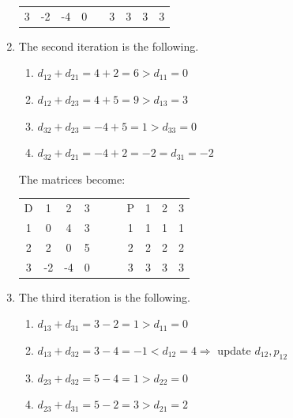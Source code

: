 \documentclass[12pt, a4paper]{report}
\begin{document}
\begin{enumerate}
\begin{table}[H]
\begin{tabular}{c|ccccc|ccc}
                    3 & -2       & -4       & 0          &                & 3 & 3 & 3 & 3  \\ 
                    \end{tabular}
                \end{table}
            \item The second iteration is the following. 
                \begin{enumerate}
                    \item $d_{12} + d_{21} = 4 + 2 = 6 > d_{11} = 0$
                    \item $d_{12} + d_{23} = 4 + 5 = 9 > d_{13} = 3$
                    \item $d_{32} + d_{23} = -4 + 5 = 1 > d_{33} = 0$
                    \item $d_{32} + d_{21} = -4 + 2 = -2 = d_{31} = -2$
                \end{enumerate}
                The matrices become: 
                \begin{table}[H]
                    \centering
                    \begin{tabular}{c|ccccc|ccc}
                    D & 1        & 2        & 3          & $\:\:\:\:\:\:$ & P & 1 & 2 & 3  \\ \cline{1-4} \cline{6-9} 
                    1 & 0        & 4        & 3          &                & 1 & 1 & 1 & 1  \\
                    2 & 2        & 0        & 5          &                & 2 & 2 & 2 & 2  \\
                    3 & -2       & -4       & 0          &                & 3 & 3 & 3 & 3  \\ 
                    \end{tabular}
                \end{table}
            \item The third iteration is the following. 
                \begin{enumerate}
                    \item $d_{13} + d_{31} = 3 - 2 = 1 > d_{11} = 0$
                    \item $d_{13} + d_{32} = 3 - 4 = -1 < d_{12} = 4 \Rightarrow$ update $d_{12}, p_{12}$
                    \item $d_{23} + d_{32} = 5 - 4 = 1 > d_{22} = 0$
                    \item $d_{23} + d_{31} = 5 - 2 = 3 > d_{21} = 2$
                \end{enumerate}

\end{enumerate}
\end{document}
